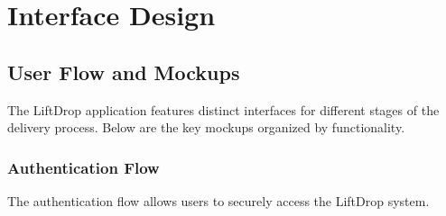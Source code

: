 \section{Interface Design}
\subsection{User Flow and Mockups}

The LiftDrop application features distinct interfaces for different stages of the delivery process. Below are the key mockups organized by functionality.

\subsubsection{Authentication Flow}

The authentication flow allows users to securely access the LiftDrop system.

